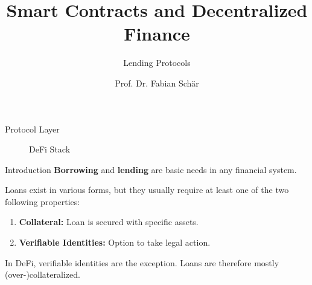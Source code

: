 \documentclass[handout]{beamer}
\title{Smart Contracts and Decentralized Finance}
\subtitle{Lending Protocols}
\author{Prof. Dr. Fabian Schär}
\institute{University of Basel}
\begin{document}
\thispagestyle{empty}
\begin{frame}[noframenumbering]
	\titlepage
\end{frame}

\begin{frame}{Protocol Layer}

\begin{figure}[t]
	\centering
	\resizebox{0.9\textwidth}{!}{
	\begin{tikzpicture}[scale=1.0, every node/.style={scale=1.0}]
		
	\end{tikzpicture}}
	\caption{DeFi Stack \cite{FS:21}}
\end{figure}
	
\end{frame}


\begin{frame}{Introduction}
\textbf{Borrowing} and \textbf{lending} are basic needs in any financial system. \\

\vspace{1em}

 {
Loans exist in various forms, but they usually require at least one of the two following properties:
\vspace{0.5em}
\begin{enumerate}
  \item \textbf{Collateral:} Loan is secured with specific assets.
  \item \textbf{Verifiable Identities:} Option to take legal action.
\end{enumerate} 
}

In DeFi, verifiable identities are the exception. Loans are therefore mostly (over-)collateralized.
	
\end{frame}
\end{document}
